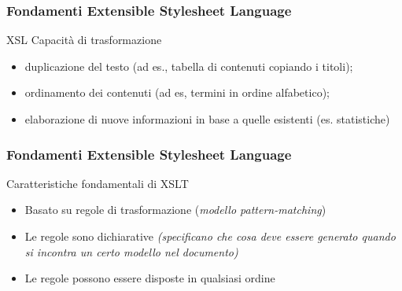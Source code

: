 \begin{frame}
    \frametitle{Fondamenti Extensible Stylesheet Language}
    \addtocounter{nframe}{1}
    

     \begin{block}{XSL Capacità di trasformazione}
         \begin{itemize}
            \item duplicazione del testo (ad es., tabella di contenuti copiando i titoli);
            \item ordinamento dei contenuti (ad es, termini in ordine alfabetico);
            \item elaborazione di nuove informazioni in base a quelle esistenti (es. statistiche)
        \end{itemize}
     \end{block}
    
\end{frame}

\begin{frame}
    \frametitle{Fondamenti Extensible Stylesheet Language}
    \addtocounter{nframe}{1}
    

     \begin{block}{Caratteristiche fondamentali di XSLT}
         \begin{itemize}
            \item Basato su regole di trasformazione (\textit{modello pattern-matching})
            \item Le regole sono dichiarative \textit{(specificano che cosa deve essere generato quando si incontra un certo modello nel documento)}
            \item Le regole possono essere disposte in qualsiasi ordine
        \end{itemize}
     \end{block}
    
\end{frame}


